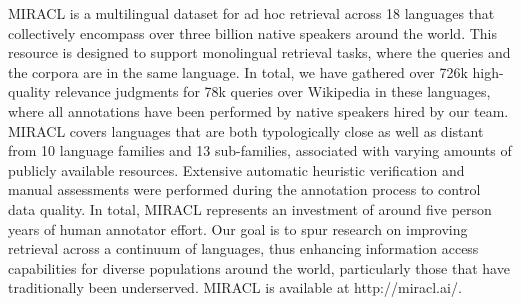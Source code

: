 MIRACL is a multilingual dataset for ad hoc retrieval across 18 languages that collectively encompass over three billion native speakers around the world. This resource is designed to support monolingual retrieval tasks, where the queries and the corpora are in the same language. In total, we have gathered over 726k high-quality relevance judgments for 78k queries over Wikipedia in these languages, where all annotations have been performed by native speakers hired by our team. MIRACL covers languages that are both typologically close as well as distant from 10 language families and 13 sub-families, associated with varying amounts of publicly available resources. Extensive automatic heuristic verification and manual assessments were performed during the annotation process to control data quality. In total, MIRACL represents an investment of around five person years of human annotator effort. Our goal is to spur research on improving retrieval across a continuum of languages, thus enhancing information access capabilities for diverse populations around the world, particularly those that have traditionally been underserved. MIRACL is available at http://miracl.ai/.